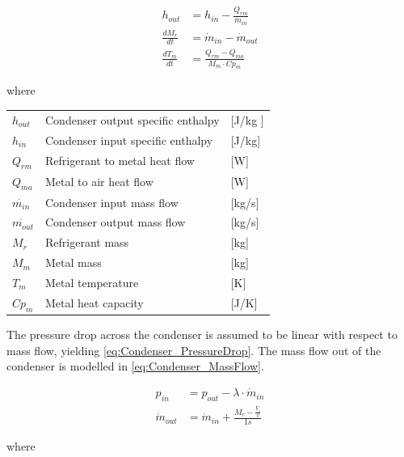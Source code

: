 \begin{align}
	h_{out} 			& = h_{in} - \frac{Q_{rm}}{\dot{m}_{in}}  	\label{eq:Condenser_Enthalpy} \\
	\frac{dM_r}{dt} 	& = \dot{m}_{in} - \dot{m}_{out} 				\label{eq:Condenser_ChangeOfMass}\\
	\frac{dT_m}{dt} 	& = \frac{Q_{rm} - Q_{ma}}{M_m \cdot Cp_m}		\label{eq:Condenser_ChangeOfTemperature}
\end{align}

where 

\begin{center}
	\begin{tabular}{l p{8cm} l}
		$h_{out}$				&  Condenser output specific enthalpy			& [\si{J}/\si{kg} ]\\
		$h_{in}$					&  Condenser input specific enthalpy 			& [\si{J}/\si{kg}] \\
		$Q_{rm}$					& Refrigerant to metal heat flow 			& [\si{W}] \\
		$Q_{ma}$					& Metal to air heat flow						& [\si{W}] \\
		$\dot{m_{in}}$			& Condenser input mass flow 			& [\si{kg}/\si{s}] \\
		$\dot{m_{out}}$			& Condenser output mass flow 		& [\si{kg}/\si{s}] \\
		$M_r$						& Refrigerant mass 								& [\si{kg}] \\
		$M_m$						& Metal mass												& [\si{kg}] \\
		$T_m$						& Metal temperature 							& [\si{K}]\\
		$Cp_m$					& Metal heat capacity 						& [\si{J}/\si{K}]\\
	\end{tabular}
\end{center}

The pressure drop across the condenser is assumed to be linear with respect to mass flow, yielding \cref{eq:Condenser_PressureDrop}.
The mass flow out of the condenser is modelled in \cref{eq:Condenser_MassFlow}.


\begin{align}
	p_{in} 	& =  p_{out} - \lambda \cdot \dot{m}_{in}  				\label{eq:Condenser_PressureDrop}\\
	\dot{m}_{out}		& = \dot{m}_{in} + \frac{M_r - \frac{V_i}{v}}{1s}		\label{eq:Condenser_MassFlow}
\end{align}

where 

